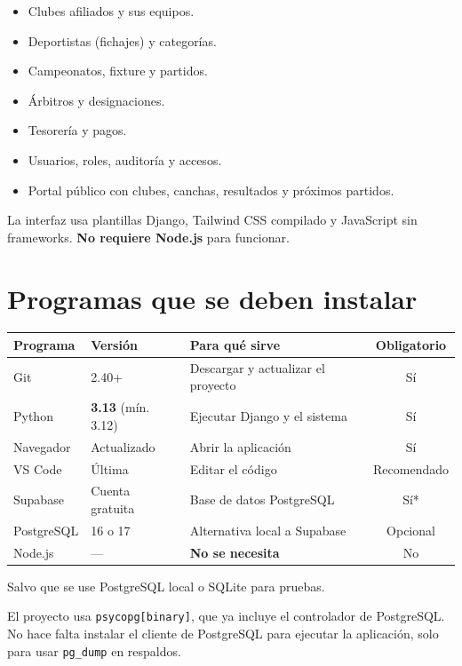 \documentclass[11pt,a4paper]{article}
\newcommand{\campo}[1]{\texttt{\small #1}}
\begin{document}
\begin{itemize}[leftmargin=1.4em]
  \item Clubes afiliados y sus equipos.
  \item Deportistas (fichajes) y categorías.
  \item Campeonatos, fixture y partidos.
  \item Árbitros y designaciones.
  \item Tesorería y pagos.
  \item Usuarios, roles, auditoría y accesos.
  \item Portal público con clubes, canchas, resultados y próximos partidos.
\end{itemize}

La interfaz usa plantillas Django, Tailwind CSS compilado y JavaScript sin
frameworks. \textbf{No requiere Node.js} para funcionar.

\section{Programas que se deben instalar}

\begin{tabularx}{\textwidth}{@{}l l X c@{}}
\toprule
\textbf{Programa} & \textbf{Versión} & \textbf{Para qué sirve} & \textbf{Obligatorio}\\
\midrule
Git & 2.40+ & Descargar y actualizar el proyecto & Sí\\
Python & \textbf{3.13} (mín. 3.12) & Ejecutar Django y el sistema & Sí\\
Navegador & Actualizado & Abrir la aplicación & Sí\\
VS Code & Última & Editar el código & Recomendado\\
Supabase & Cuenta gratuita & Base de datos PostgreSQL & Sí*\\
PostgreSQL & 16 o 17 & Alternativa local a Supabase & Opcional\\
Node.js & --- & \textbf{No se necesita} & No\\
\bottomrule
\end{tabularx}

\smallskip
{\small * Salvo que se use PostgreSQL local o SQLite para pruebas.}

\medskip
El proyecto usa \campo{psycopg[binary]}, que ya incluye el controlador de
PostgreSQL. No hace falta instalar el cliente de PostgreSQL para ejecutar la
aplicación, solo para usar \campo{pg\_dump} en respaldos.
\end{document}
